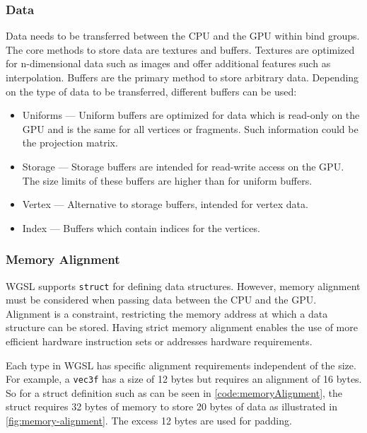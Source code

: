 \subsubsection{Data}

Data needs to be transferred between the \gls{CPU} and the \gls{GPU} within bind groups. The core methods to store data are textures and buffers. Textures are optimized for n-dimensional data such as images and offer additional features such as interpolation. Buffers are the primary method to store arbitrary data. Depending on the type of data to be transferred, different buffers can be used:

\begin{itemize}
  \item{Uniforms} — Uniform buffers are optimized for data which is read-only on the \gls{GPU} and is the same for all vertices or fragments. Such information could be the projection matrix.
  \item{Storage} — Storage buffers are intended for read-write access on the \gls{GPU}. The size limits of these buffers are higher than for uniform buffers.
  \item{Vertex} — Alternative to storage buffers, intended for vertex data.
  \item{Index} — Buffers which contain indices for the vertices.
\end{itemize}

\subsubsection{Memory Alignment}
\label{ch:memoryAlignmentTheory}

\gls{WGSL} supports \texttt{struct} for defining data structures. However, memory alignment must be considered when passing data between the \gls{CPU} and the \gls{GPU}. Alignment is a constraint, restricting the memory address at which a data structure can be stored. Having strict memory alignment enables the use of more efficient hardware instruction sets or addresses hardware requirements.

Each type in \gls{WGSL} has specific alignment requirements independent of the size. For example, a \texttt{vec3f} has a size of 12 bytes but requires an alignment of 16 bytes. So for a struct definition such as can be seen in \autoref{code:memoryAlignment}, the struct requires 32 bytes of memory to store 20 bytes of data as illustrated in \autoref{fig:memory-alignment}. The excess 12 bytes are used for padding.

